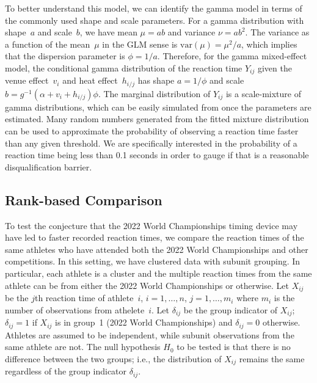 \documentclass[12pt, letterpaper, titlepage]{article}
\begin{document}
To better understand this model, we can identify the gamma model in terms of the
commonly used shape and scale parameters. For a gamma distribution with
shape~$a$ and scale~$b$, we have mean $\mu = ab$ and variance $\nu = ab^2$. The
variance as a function of the mean~$\mu$ in the GLM sense is
$\text{var}(\mu) = \mu^2 / a$, which implies that the dispersion parameter is
$\phi = 1 / a$. Therefore, for the gamma mixed-effect model, the conditional
gamma distribution of the reaction time $Y_{ij}$ given the venue
effect~$v_i$ and heat effect~$h_{i/j}$
has shape $a = 1 / \phi$ and scale
$b = g^{-1}(\alpha + v_i + h_{i/j}) \phi$. The marginal
distribution of $Y_{ij}$ is a scale-mixture of gamma distributions, which can be
easily simulated from once the parameters are estimated. Many
random numbers generated from the fitted mixture distribution can be used to
approximate the probability of observing a reaction time faster than any given
threshold.  We are specifically interested in the probability of a reaction time
being less than 0.1 seconds in order to gauge if that is a reasonable 
disqualification barrier.


\subsection{Rank-based Comparison}\label{sec:rank_methods}


To test the conjecture that the 2022 World Championships timing device may have 
led to faster recorded reaction times, we compare the reaction times of the same
athletes who have attended both the 2022 World Championships and other 
competitions. 
In this setting, we have clustered data with subunit grouping. In particular,
each athlete is a cluster and the multiple reaction times from the same athlete
can be from either the 2022 World Championships or otherwise.
Let $X_{ij}$ be the $j$th reaction time of athlete~$i$, $i = 1, \ldots, n$,
$j = 1, \ldots, m_i$ where $m_i$ is the number of observations from
athelete~$i$. Let $\delta_{ij}$ be the group indicator of $X_{ij}$; $\delta_{ij}
= 1$ if $X_{ij}$ is in group~1 (2022 World Championships) and $\delta_{ij} = 0$ 
otherwise. Athletes are
assumed to be independent, while subunit observations from the same athlete are
not. The null hypothesis $H_0$ to be tested is that there is no difference
between the two groups; i.e., the distribution of $X_{ij}$ remains the same
regardless of the group indicator $\delta_{ij}$.
\end{document}
